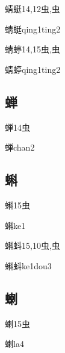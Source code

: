 \begin{Entry}{蜻蜓}{14,12}{⾍,⾍}
  \begin{Phonetics}{蜻蜓}{qing1ting2}
  \end{Phonetics}
\end{Entry}

\begin{Entry}{蜻蝏}{14,15}{⾍,⾍}
  \begin{Phonetics}{蜻蝏}{qing1ting2}
  \end{Phonetics}
\end{Entry}

\subsection*{蝉}

\begin{Entry}{蝉}{14}{⾍}
  \begin{Phonetics}{蝉}{chan2}
  \end{Phonetics}
\end{Entry}

\subsection*{蝌}

\begin{Entry}{蝌}{15}{⾍}
  \begin{Phonetics}{蝌}{ke1}
  \end{Phonetics}
\end{Entry}

\begin{Entry}{蝌蚪}{15,10}{⾍,⾍}
  \begin{Phonetics}{蝌蚪}{ke1dou3}
  \end{Phonetics}
\end{Entry}

\subsection*{蝲}

\begin{Entry}{蝲}{15}{⾍}
  \begin{Phonetics}{蝲}{la4}
  \end{Phonetics}
\end{Entry}

